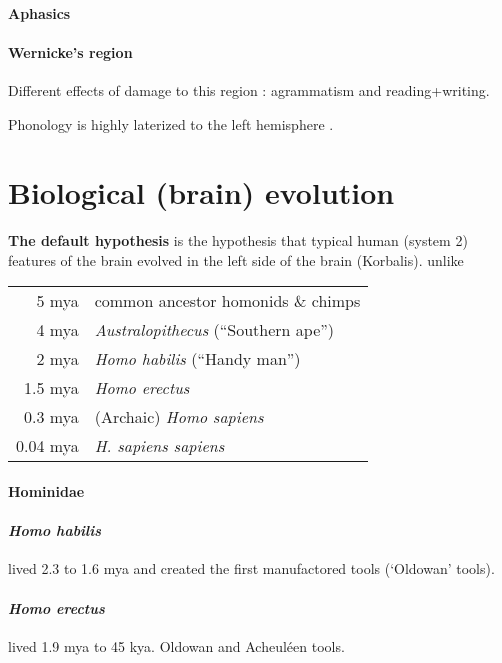 \documentclass{article}
\begin{document}
\paragraph{Aphasics}

\paragraph{Wernicke's region}

Different effects of damage to this region \citep[p.~262]{donald1991}: agrammatism and reading+writing.

Phonology is highly laterized to the left hemisphere \citep[p.~262]{donald1991}.

\section{Biological (brain) evolution}
\label{sec:biological_evolution}

\textbf{The default hypothesis} is the hypothesis that typical human (system 2) features
of the brain evolved in the left side of the brain (Korbalis).
unlike
\begin{tabular}{rl}
5 mya & common ancestor homonids \& chimps \\
4 mya & \textit{Australopithecus} (“Southern ape”) \\
2 mya & \textit{Homo habilis} (“Handy man”) \\
1.5 mya & \textit{Homo erectus} \\
0.3 mya & (Archaic) \textit{Homo sapiens} \\
0.04 mya & \textit{H. sapiens sapiens} \\
\end{tabular}

\paragraph{Hominidae}

\paragraph{\textit{Homo habilis}} lived 2.3 to 1.6 mya and created the first manufactored tools (`Oldowan' tools).

\paragraph{\textit{Homo erectus}} lived 1.9 mya to 45 kya.
Oldowan and Acheuléen tools.
\end{document}
